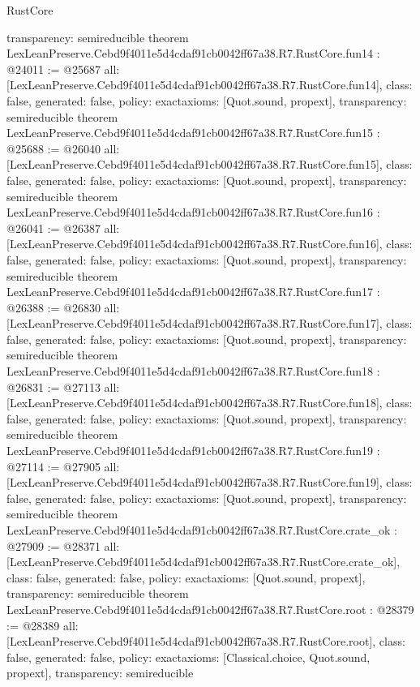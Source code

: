 \begin{lexlean}{RustCore}
\begin{coremodule}
{  transparency: semireducible
}
theorem LexLeanPreserve.Cebd9f4011e5d4cdaf91cb0042ff67a38.R7.RustCore.fun14 : @24011 := @25687 {
  all: [LexLeanPreserve.Cebd9f4011e5d4cdaf91cb0042ff67a38.R7.RustCore.fun14],
  class: false,
  generated: false,
  policy: exact{axioms: [Quot.sound, propext]},
  transparency: semireducible
}
theorem LexLeanPreserve.Cebd9f4011e5d4cdaf91cb0042ff67a38.R7.RustCore.fun15 : @25688 := @26040 {
  all: [LexLeanPreserve.Cebd9f4011e5d4cdaf91cb0042ff67a38.R7.RustCore.fun15],
  class: false,
  generated: false,
  policy: exact{axioms: [Quot.sound, propext]},
  transparency: semireducible
}
theorem LexLeanPreserve.Cebd9f4011e5d4cdaf91cb0042ff67a38.R7.RustCore.fun16 : @26041 := @26387 {
  all: [LexLeanPreserve.Cebd9f4011e5d4cdaf91cb0042ff67a38.R7.RustCore.fun16],
  class: false,
  generated: false,
  policy: exact{axioms: [Quot.sound, propext]},
  transparency: semireducible
}
theorem LexLeanPreserve.Cebd9f4011e5d4cdaf91cb0042ff67a38.R7.RustCore.fun17 : @26388 := @26830 {
  all: [LexLeanPreserve.Cebd9f4011e5d4cdaf91cb0042ff67a38.R7.RustCore.fun17],
  class: false,
  generated: false,
  policy: exact{axioms: [Quot.sound, propext]},
  transparency: semireducible
}
theorem LexLeanPreserve.Cebd9f4011e5d4cdaf91cb0042ff67a38.R7.RustCore.fun18 : @26831 := @27113 {
  all: [LexLeanPreserve.Cebd9f4011e5d4cdaf91cb0042ff67a38.R7.RustCore.fun18],
  class: false,
  generated: false,
  policy: exact{axioms: [Quot.sound, propext]},
  transparency: semireducible
}
theorem LexLeanPreserve.Cebd9f4011e5d4cdaf91cb0042ff67a38.R7.RustCore.fun19 : @27114 := @27905 {
  all: [LexLeanPreserve.Cebd9f4011e5d4cdaf91cb0042ff67a38.R7.RustCore.fun19],
  class: false,
  generated: false,
  policy: exact{axioms: [Quot.sound, propext]},
  transparency: semireducible
}
theorem LexLeanPreserve.Cebd9f4011e5d4cdaf91cb0042ff67a38.R7.RustCore.crate_ok : @27909 := @28371 {
  all: [LexLeanPreserve.Cebd9f4011e5d4cdaf91cb0042ff67a38.R7.RustCore.crate_ok],
  class: false,
  generated: false,
  policy: exact{axioms: [Quot.sound, propext]},
  transparency: semireducible
}
theorem LexLeanPreserve.Cebd9f4011e5d4cdaf91cb0042ff67a38.R7.RustCore.root : @28379 := @28389 {
  all: [LexLeanPreserve.Cebd9f4011e5d4cdaf91cb0042ff67a38.R7.RustCore.root],
  class: false,
  generated: false,
  policy: exact{axioms: [Classical.choice, Quot.sound, propext]},
  transparency: semireducible
}


\end{coremodule}
\end{lexlean}
